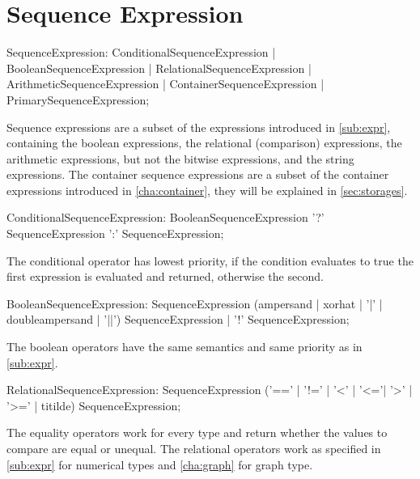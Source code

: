 \section{Sequence Expression} \label{sec:seqexpr}

\begin{rail}
  SequenceExpression:  
    ConditionalSequenceExpression |
    BooleanSequenceExpression |
    RelationalSequenceExpression |
    ArithmeticSequenceExpression |
    ContainerSequenceExpression |
    PrimarySequenceExpression;
\end{rail}

Sequence expressions are a subset of the expressions introduced in \ref{sub:expr}, containing 
the boolean expressions,
the relational (comparison) expressions,
the arithmetic expressions, but not the bitwise expressions,
and the string expressions.
The container sequence expressions are a subset of the container expressions introduced in \ref{cha:container}, they will be explained in \ref{sec:storages}.

\begin{rail}
  ConditionalSequenceExpression: 
    BooleanSequenceExpression '?' SequenceExpression ':' SequenceExpression;
\end{rail}

The conditional operator has lowest priority, if the condition evaluates to true the first expression is evaluated and returned, otherwise the second.

\begin{rail}
  BooleanSequenceExpression: 
    SequenceExpression (ampersand | xorhat | '|' | doubleampersand | '||') SequenceExpression |
    '!' SequenceExpression;
\end{rail}

The boolean operators have the same semantics and same priority as in \ref{sub:expr}.

\begin{rail}
  RelationalSequenceExpression: 
    SequenceExpression ('==' | '!=' | '<' | '<='| '>' | '>=' | titilde) SequenceExpression;
\end{rail}

The equality operators work for every type and return whether the values to compare are equal or unequal.
The relational operators work as specified in \ref{sub:expr} for numerical types and \ref{cha:graph} for graph type.

